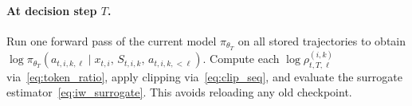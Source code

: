 \paragraph{At decision step $T$.} Run one forward pass of the current model $\pi_{\theta_T}$ on all stored trajectories to obtain $\log \pi_{\theta_T}(a_{t,i,k,\ell} \mid x_{t,i},\, S_{t,i,k},\, a_{t,i,k,<\ell})$.  Compute each $\log \rho_{t,T,\ell}^{(i,k)}$ via~\eqref{eq:token_ratio}, apply clipping via~\eqref{eq:clip_seq}, and evaluate the surrogate estimator~\eqref{eq:iw_surrogate}.  This avoids reloading any old checkpoint.
